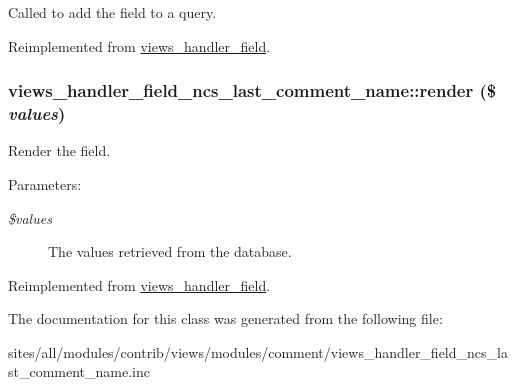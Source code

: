 Called to add the field to a query. 

Reimplemented from \hyperlink{classviews__handler__field_4f661f91bcbe80d4a00c30a31456c502}{views\_\-handler\_\-field}.\hypertarget{classviews__handler__field__ncs__last__comment__name_eb44418e481bfca1f6dbb249a1f5c665}{
\subsubsection[{render}]{\setlength{\rightskip}{0pt plus 5cm}views\_\-handler\_\-field\_\-ncs\_\-last\_\-comment\_\-name::render (\$ {\em values})}}
\label{classviews__handler__field__ncs__last__comment__name_eb44418e481bfca1f6dbb249a1f5c665}


Render the field.

\begin{Desc}
\item[Parameters:]
\begin{description}
\item[{\em \$values}]The values retrieved from the database. \end{description}
\end{Desc}


Reimplemented from \hyperlink{classviews__handler__field_82ff951c5e9ceb97b2eab86f880cbc1e}{views\_\-handler\_\-field}.

The documentation for this class was generated from the following file:\begin{CompactItemize}
\item 
sites/all/modules/contrib/views/modules/comment/views\_\-handler\_\-field\_\-ncs\_\-last\_\-comment\_\-name.inc\end{CompactItemize}
